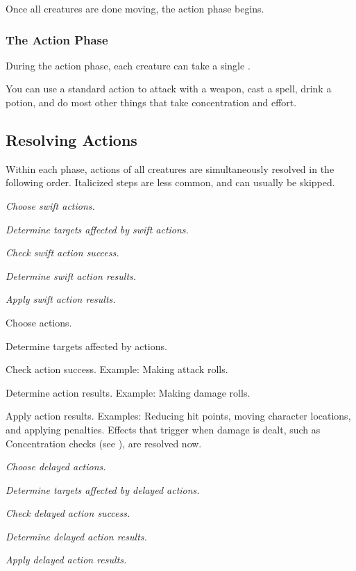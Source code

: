             Once all creatures are done moving, the action phase begins.

        \subsubsection{The Action Phase}\label{The Action Phase}

            During the action phase, each creature can take a single .

             You can use a standard action to attack with a weapon, cast a spell, drink a potion, and do most other things that take concentration and effort.

    \subsection{Resolving Actions}\label{Resolving Actions}

        Within each phase, actions of all creatures are simultaneously resolved in the following order.
        Italicized steps are less common, and can usually be skipped.

        \begin{enumerate*}
            \item \textit{Choose swift actions.}
            \item \textit{Determine targets affected by swift actions.}
            \item \textit{Check swift action success.}
            \item \textit{Determine swift action results.}
            \item \textit{Apply swift action results.}
            \item Choose actions.
            \item Determine targets affected by actions.
            \item Check action success.
                Example: Making attack rolls.
            \item Determine action results.
                Example: Making damage rolls.
            \item Apply action results.
                Examples: Reducing hit points, moving character locations, and applying penalties.
                Effects that trigger when damage is dealt, such as Concentration checks (see ), are resolved now.
            \item \textit{Choose delayed actions.}
            \item \textit{Determine targets affected by delayed actions.}
            \item \textit{Check delayed action success.}
            \item \textit{Determine delayed action results.}
            \item \textit{Apply delayed action results.}
        \end{enumerate*}

